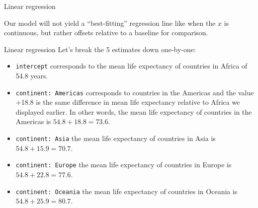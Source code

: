 \documentclass[
  ignorenonframetext,
]{beamer}
\begin{document}
\begin{frame}[fragile]{Linear regression}
\normalsize

Our model will not yield a ``best-fitting'' regression line like when
the \(x\) is continuous, but rather offsets relative to a baseline for
comparison.
\end{frame}

\begin{frame}[fragile]{Linear regression}
\label{linear-regression-1}
Let's break the 5 estimates down one-by-one:

\begin{itemize}
\item
  \texttt{intercept} corresponds to the mean life expectancy of
  countries in Africa of 54.8 years.
\item
  \texttt{continent:\ Americas} corresponds to countries in the Americas
  and the value +18.8 is the same difference in mean life expectancy
  relative to Africa we displayed earlier. In other words, the mean life
  expectancy of countries in the Americas is \(54.8+18.8=73.6\).
\item
  \texttt{continent:\ Asia} the mean life expectancy of countries in
  Asia is \(54.8+ 15.9=70.7\).
\item
  \texttt{continent:\ Europe} the mean life expectancy of countries in
  Europe is \(54.8+22.8=77.6\).
\item
  \texttt{continent:\ Oceania} the mean life expectancy of countries in
  Oceania is \(54.8+25.9=80.7\).
\end{itemize}
\end{frame}
\end{document}
